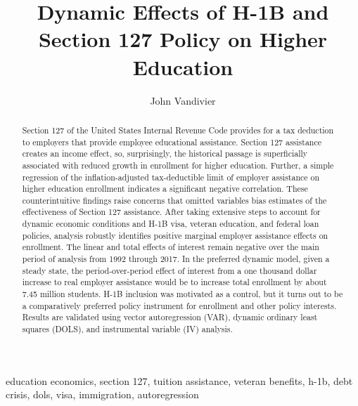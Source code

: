 \documentclass[review]{elsarticle}
\begin{document}
\begin{frontmatter}

    \title{
        Dynamic Effects of H-1B and Section 127 Policy on Higher Education
    }

    \author[mymainaddress]{John Vandivier} %
    \address[mymainaddress]{4400 University Dr, Fairfax, VA 22030}

    \begin{abstract}
        Section 127 of the United States Internal Revenue Code provides for a tax deduction to employers that provide employee educational assistance.
        Section 127 assistance creates an income effect, so, surprisingly,
        the historical passage is superficially associated with reduced growth in enrollment for higher education.
        Further, a simple regression of the inflation-adjusted tax-deductible limit of employer assistance on higher education enrollment indicates a significant negative correlation.
        These counterintuitive findings raise concerns that omitted variables bias estimates of the effectiveness of Section 127 assistance.
        After taking extensive steps to account for dynamic economic conditions and H-1B visa, veteran education, and federal loan policies,
        analysis robustly identifies positive marginal employer assistance effects on enrollment.
        The linear and total effects of interest remain negative over the main period of analysis from 1992 through 2017.
        In the preferred dynamic model, given a steady state,
        the period-over-period effect of interest from a one thousand dollar increase to real employer assistance would be to increase total enrollment by about 7.45 million students.
        H-1B inclusion was motivated as a control, but it turns out to be a comparatively preferred policy instrument for enrollment and other policy interests.
        Results are validated using vector autoregression (VAR), dynamic ordinary least squares (DOLS), and instrumental variable (IV) analysis.
    \end{abstract}

    \begin{keyword}
        education economics, section 127, tuition assistance, veteran benefits, h-1b, debt crisis, dols, visa, immigration, autoregression %
        \MSC[2010] %
    \end{keyword}
\end{frontmatter}
\end{document}
